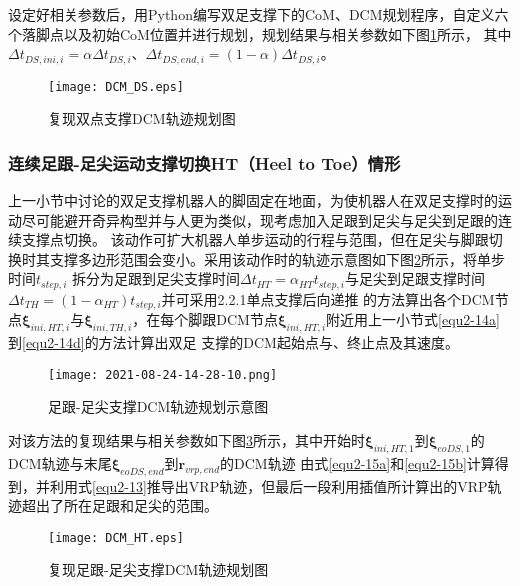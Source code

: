             设定好相关参数后，用Python编写双足支撑下的CoM、DCM规划程序，自定义六个落脚点以及初始CoM位置并进行规划，规划结果与相关参数如下图\ref{fig2-6}所示，
            其中$\varDelta t_{DS,ini,i}=\alpha\varDelta t_{DS,i}$、$\varDelta t_{DS,end,i}=(1-\alpha)\varDelta t_{DS,i}$。
            \begin{figure}[ht] 
                \centering
                \texttt{[image: DCM\_DS.eps]}
                \caption{复现双点支撑DCM轨迹规划图} \label{fig2-6}
            \end{figure}
            \FloatBarrier
        \subsubsection{连续足跟-足尖运动支撑切换HT（Heel to Toe）情形}
            上一小节中讨论的双足支撑机器人的脚固定在地面，为使机器人在双足支撑时的运动尽可能避开奇异构型并与人更为类似，现考虑加入足跟到足尖与足尖到足跟的连续支撑点切换。
            该动作可扩大机器人单步运动的行程与范围，但在足尖与脚跟切换时其支撑多边形范围会变小。采用该动作时的轨迹示意图如下图\ref{fig2-7}所示，将单步时间$t_{step,i}$
            拆分为足跟到足尖支撑时间$\varDelta t_{HT}=\alpha_{HT}t_{step,i}$与足尖到足跟支撑时间$\varDelta t_{TH}=(1-\alpha_{HT})t_{step,i}$并可采用2.2.1单点支撑后向递推
            的方法算出各个DCM节点$\boldsymbol{\xi}_{ini,HT,i}$与$\boldsymbol{\xi}_{ini,TH,i}$，在每个脚跟DCM节点$\boldsymbol{\xi}_{ini,HT,i}$附近用上一小节式\eqref{equ2-14a}到\eqref{equ2-14d}的方法计算出双足
            支撑的DCM起始点与、终止点及其速度。
            \begin{figure}[h] 
                \centering
                \texttt{[image: 2021-08-24-14-28-10.png]}
                \caption{足跟-足尖支撑DCM轨迹规划示意图} \label{fig2-7}
            \end{figure}
            \FloatBarrier
            对该方法的复现结果与相关参数如下图\ref{fig2-8}所示，其中开始时$\boldsymbol{\xi}_{ini,HT,1}$到$\boldsymbol{\xi}_{eoDS,1}$的DCM轨迹与末尾$\boldsymbol{\xi}_{eoDS,end}$到$\boldsymbol{r}_{vrp,end}$的DCM轨迹
            由式\eqref{equ2-15a}和\eqref{equ2-15b}计算得到，并利用式\eqref{equ2-13}推导出VRP轨迹，但最后一段利用插值所计算出的VRP轨迹超出了所在足跟和足尖的范围。
            \begin{figure}[h] 
                \centering
                \texttt{[image: DCM\_HT.eps]}
                \caption{复现足跟-足尖支撑DCM轨迹规划图} \label{fig2-8}
            \end{figure}
            \FloatBarrier
